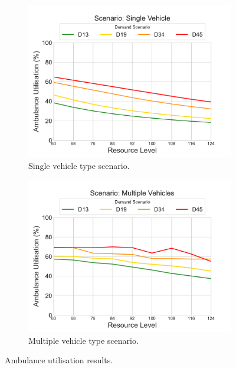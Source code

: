 \documentclass[preprint,12pt]{elsarticle}
\begin{document}
\begin{figure}
\begin{center}
\begin{subfigure}{0.43\textwidth}
\includegraphics[width=\textwidth]{img/results/single_AmbulanceUtilisation}
\caption{Single vehicle type scenario.}
\label{fig:results_ambulance_utilisation_single}
\end{subfigure}
\begin{subfigure}{0.43\textwidth}
\includegraphics[width=\textwidth]{img/results/multiple_AmbulanceUtilisation}
\caption{Multiple vehicle type scenario.}
\label{fig:results_ambulance_utilisation_multiple}
\end{subfigure}
\end{center}
\caption{Ambulance utilisation results.}
\label{fig:results_ambulance_utilisation}
\end{figure}
\end{document}

